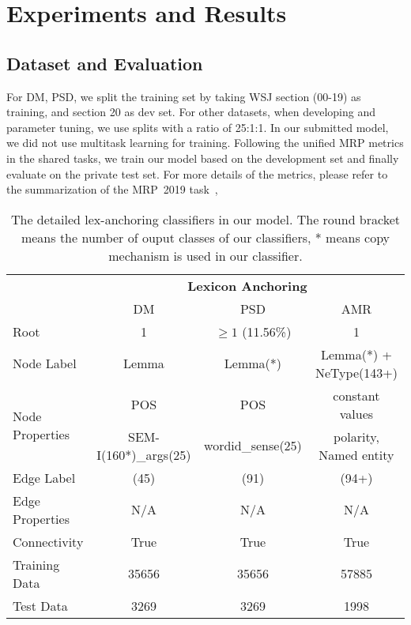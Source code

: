 \section{Experiments and Results}
\label{sec:lex-phr:exp}

\subsection{Dataset and Evaluation}
\label{ssec:data_eval}

For DM, PSD, we split the training set by taking WSJ section (00-19)
as training, and section 20 as dev set. For other datasets, when
developing and parameter tuning, we use splits with a ratio of
25:1:1. In our submitted model, we did not use multitask learning for
training. Following the unified MRP metrics in the shared tasks, we
train our model based on the development set and finally evaluate on
the private test set.  For more details of the metrics, please refer
to the summarization of the MRP~2019 task~\cite{Oep:Abe:Haj:19},
\begin{table}[!ht]
\caption{The detailed lex-anchoring classifiers in our model. The
  round bracket means the number of ouput classes of our classifiers,
  * means copy mechanism is used in our classifier. }
\label{tbl:lex:impl_lex}
\begin{center}
\small
\begin{tabular}{l|ccc}
\toprule
\hline
                                 & \multicolumn{3}{c}{{\bf Lexicon Anchoring}}                         \\ \cline{2-4}
                                 & DM                    & PSD               & AMR                     \\ \hline
Root                             & 1                     & $ \geq 1$ (11.56\%)  & 1                       \\ \hline
Node Label                       & Lemma                 & Lemma(*)          & Lemma(*) + NeType(143+) \\ \hline
\multirow{2}{*}{Node Properties} & POS                   & POS               & constant values         \\
                                 & SEM-I(160*)\_args(25) & wordid\_sense(25) & polarity, Named entity  \\ \hline
Edge Label                       & (45)                  & (91)              & (94+)                   \\ \hline
Edge Properties                  & N/A                   & N/A               & N/A                     \\ \hline
Connectivity                     & True                  & True              & True                    \\ \hline
Training Data                    & 35656                 & 35656             & 57885                   \\ \hline
Test Data                        & 3269                  & 3269              & 1998                    \\ \hline \bottomrule
\end{tabular}
\end{center}
\end{table}


